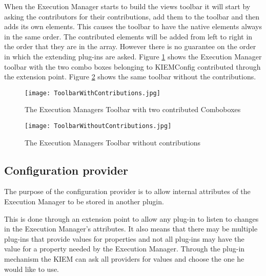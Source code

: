 When the Execution Manager starts to build the views toolbar it will start by asking the contributors
for their contributions, add them to the toolbar and then adds its own elements. This causes
the toolbar to have the native elements always in the same order.
The contributed elements will be added from left to right in the order that they are in the array. However there
is no guarantee on the order in which the extending plug-ins are asked.
Figure \ref{fig:ToolbarWithContributions} shows the Execution Manager toolbar with the two combo boxes belonging to \ac{KIEMConfig}
contributed through the extension point. Figure \ref{fig:ToolbarWithoutContributions} shows the same toolbar without
the contributions.
\begin{figure}[ToolbarWithContributions]
  \centering
  \texttt{[image: ToolbarWithContributions.jpg]}
  \caption[The Execution Managers Toolbar with two contributed Comboboxes]%
  {The Execution Managers Toolbar with two contributed Comboboxes\protect\footnotemark}
  \label{fig:ToolbarWithContributions}
\end{figure}
\begin{figure}[ToolbarWithoutContributions]
  \centering
  \texttt{[image: ToolbarWithoutContributions.jpg]}
  \caption[The Execution Managers Toolbar without contributions]%
  {The Execution Managers Toolbar without contributions\protect\footnotemark}
  \label{fig:ToolbarWithoutContributions}
\end{figure}


\subsection{Configuration provider}
\label{section:ConfigurationProvider}
The purpose of the configuration provider is to allow internal attributes of the
Execution Manager to be stored in another plugin. 

This is done through an extension point to allow any plug-in to listen to changes
in the Execution Manager's attributes. It also means that there may be multiple
plug-ins that provide values for properties and not all plug-ins may have the value for
a property needed by the Execution Manager. Through the plug-in mechanism the \ac{KIEM}
can ask all providers for values and choose the one he would like to use.

